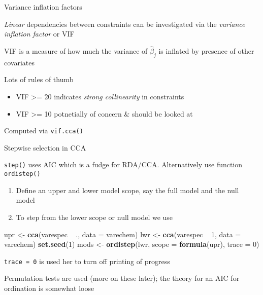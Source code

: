 \documentclass[10pt,ignorenonframetext,compress, aspectratio=169]{beamer}
\newenvironment{Shaded}{\begin{snugshade}}{\end{snugshade}}
\newcommand{\KeywordTok}[1]{\textcolor[rgb]{0.13,0.29,0.53}{\textbf{{#1}}}}
\newcommand{\DataTypeTok}[1]{\textcolor[rgb]{0.13,0.29,0.53}{{#1}}}
\newcommand{\DecValTok}[1]{\textcolor[rgb]{0.00,0.00,0.81}{{#1}}}
\newcommand{\StringTok}[1]{\textcolor[rgb]{0.31,0.60,0.02}{{#1}}}
\newcommand{\NormalTok}[1]{{#1}}
\begin{document}
\begin{frame}{Variance inflation factors}

\emph{Linear} dependencies between constraints can be investigated via
the \emph{variance inflation factor} or VIF

VIF is a measure of how much the variance of \(\hat{\beta}_j\) is
inflated by presence of other covariates

Lots of rules of thumb

\begin{itemize}
\itemsep1pt\parskip0pt
\item
  VIF \textgreater{}= 20 indicates \emph{strong collinearity} in
  constraints
\item
  VIF \textgreater{}= 10 potnetially of concern \& should be looked at
\end{itemize}

Computed via \texttt{vif.cca()}

\end{frame}

\begin{frame}[fragile]{Stepwise selection in CCA}

\texttt{step()} uses AIC which is a fudge for RDA/CCA. Alternatively use
function \texttt{ordistep()}

\begin{enumerate}
\def\labelenumi{\arabic{enumi}.}
\itemsep1pt\parskip0pt
\item
  Define an upper and lower model scope, say the full model and the null
  model
\item
  To step from the lower scope or null model we use
\end{enumerate}

\scriptsize

\begin{Shaded}
\begin{Highlighting}[]
\NormalTok{upr <-}\StringTok{ }\KeywordTok{cca}\NormalTok{(varespec ~}\StringTok{ }\NormalTok{., }\DataTypeTok{data =} \NormalTok{varechem)}
\NormalTok{lwr <-}\StringTok{ }\KeywordTok{cca}\NormalTok{(varespec ~}\StringTok{ }\DecValTok{1}\NormalTok{, }\DataTypeTok{data =} \NormalTok{varechem)}
\KeywordTok{set.seed}\NormalTok{(}\DecValTok{1}\NormalTok{)}
\NormalTok{mods <-}\StringTok{ }\KeywordTok{ordistep}\NormalTok{(lwr, }\DataTypeTok{scope =} \KeywordTok{formula}\NormalTok{(upr), }\DataTypeTok{trace =} \DecValTok{0}\NormalTok{)}
\end{Highlighting}
\end{Shaded}

\normalsize

\texttt{trace\ =\ 0} is used her to turn off printing of progress

Permutation tests are used (more on these later); the theory for an AIC
for ordination is somewhat loose

\end{frame}
\end{document}
